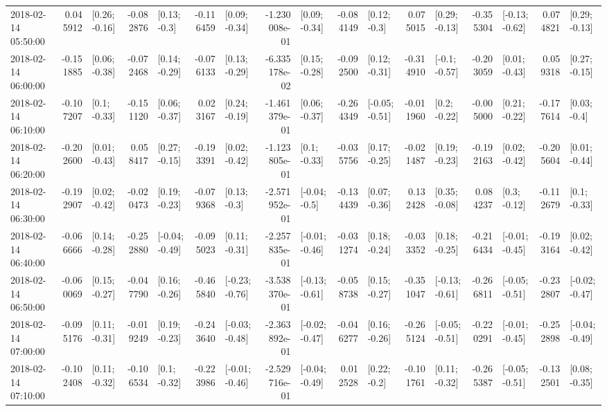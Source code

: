 \begin{tabular}{lrlrlrlrlrlrlrlrl}
2018-02-14 05:50:00 &  0.045912 &   [0.26; -0.16] & -0.082876 &    [0.13; -0.3] & -0.116459 &   [0.09; -0.34] & -1.230008e-01 &   [0.09; -0.34] & -0.084149 &    [0.12; -0.3] &  0.075015 &   [0.29; -0.13] & -0.355304 &  [-0.13; -0.62] &  0.074821 &   [0.29; -0.13] \\
2018-02-14 06:00:00 & -0.151885 &   [0.06; -0.38] & -0.072468 &   [0.14; -0.29] & -0.076133 &   [0.13; -0.29] & -6.335178e-02 &   [0.15; -0.28] & -0.092500 &   [0.12; -0.31] & -0.314910 &   [-0.1; -0.57] & -0.203059 &   [0.01; -0.43] &  0.059318 &   [0.27; -0.15] \\
2018-02-14 06:10:00 & -0.107207 &    [0.1; -0.33] & -0.151120 &   [0.06; -0.37] &  0.023167 &   [0.24; -0.19] & -1.461379e-01 &   [0.06; -0.37] & -0.264349 &  [-0.05; -0.51] & -0.011960 &    [0.2; -0.22] & -0.005000 &   [0.21; -0.22] & -0.177614 &    [0.03; -0.4] \\
2018-02-14 06:20:00 & -0.202600 &   [0.01; -0.43] &  0.058417 &   [0.27; -0.15] & -0.193391 &   [0.02; -0.42] & -1.123805e-01 &    [0.1; -0.33] & -0.035756 &   [0.17; -0.25] & -0.021487 &   [0.19; -0.23] & -0.192163 &   [0.02; -0.42] & -0.205604 &   [0.01; -0.44] \\
2018-02-14 06:30:00 & -0.192907 &   [0.02; -0.42] & -0.020473 &   [0.19; -0.23] & -0.079368 &    [0.13; -0.3] & -2.571952e-01 &   [-0.04; -0.5] & -0.134439 &   [0.07; -0.36] &  0.132428 &   [0.35; -0.08] &  0.084237 &    [0.3; -0.12] & -0.112679 &    [0.1; -0.33] \\
2018-02-14 06:40:00 & -0.066666 &   [0.14; -0.28] & -0.252880 &  [-0.04; -0.49] & -0.095023 &   [0.11; -0.31] & -2.257835e-01 &  [-0.01; -0.46] & -0.031274 &   [0.18; -0.24] & -0.033352 &   [0.18; -0.25] & -0.216434 &  [-0.01; -0.45] & -0.193164 &   [0.02; -0.42] \\
2018-02-14 06:50:00 & -0.060069 &   [0.15; -0.27] & -0.047790 &   [0.16; -0.26] & -0.465840 &  [-0.23; -0.76] & -3.538370e-01 &  [-0.13; -0.61] & -0.058738 &   [0.15; -0.27] & -0.351047 &  [-0.13; -0.61] & -0.266811 &  [-0.05; -0.51] & -0.232807 &  [-0.02; -0.47] \\
2018-02-14 07:00:00 & -0.095176 &   [0.11; -0.31] & -0.019249 &   [0.19; -0.23] & -0.243640 &  [-0.03; -0.48] & -2.363892e-01 &  [-0.02; -0.47] & -0.046277 &   [0.16; -0.26] & -0.265124 &  [-0.05; -0.51] & -0.220291 &  [-0.01; -0.45] & -0.252898 &  [-0.04; -0.49] \\
2018-02-14 07:10:00 & -0.102408 &   [0.11; -0.32] & -0.106534 &    [0.1; -0.32] & -0.223986 &  [-0.01; -0.46] & -2.529716e-01 &  [-0.04; -0.49] &  0.012528 &    [0.22; -0.2] & -0.101761 &   [0.11; -0.32] & -0.265387 &  [-0.05; -0.51] & -0.132501 &   [0.08; -0.35] \\

\end{tabular}
